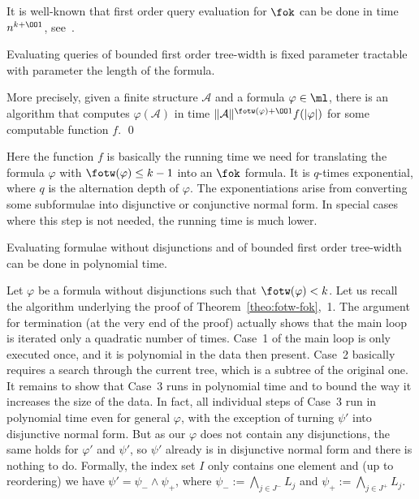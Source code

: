 \documentclass{LMCS}
\renewcommand{\phi}{\varphi}
\begin{document}
It is well-known that first order query evaluation for $\fok$ 
can be done in time $n^{k+\OO1}$, see~\cite{vardi95}. 

\begin{cor}\label{cor:fo-eval}
	Evaluating queries of bounded first order tree-width is fixed
	parameter tractable with parameter the length of the formula. 
	
	More precisely, given a finite structure $\mathcal A$ 
and a formula $\phi\in\ml$, 
there is an algorithm that computes $\phi(\mathcal A)$ in time 
$\|\mathcal A\|^{\fotw(\phi)+\OO1}f(\left|\varphi\right|)$
for some computable function $f$.
\qed\end{cor}

Here the function $f$ is basically the running time we need for translating 
the formula $\phi$ with $\fotw(\phi)\leq k-1$
into an $\fok$ formula. It is $q$-times exponential, 
where $q$ is the alternation depth of $\phi$. 
The exponentiations arise from converting some subformulae 
into disjunctive or conjunctive normal form. 
In special cases where this step is not needed, the running time is much lower. 

\begin{cor}\label{cor:mc in ptime}
Evaluating formulae without disjunctions and of bounded first order tree-width 
can be done in polynomial time. 
\end{cor}

\proof
Let $\phi$ be a formula without disjunctions such that $\fotw(\phi)<k$. 
Let us recall the algorithm 
underlying the proof of Theorem~\ref{theo:fotw-fok},~1. 
The argument for termination (at the very end of the proof) 
actually shows that the main loop is iterated only a quadratic number of times. 
Case~1 of the main loop is only executed once, 
and it is polynomial in the data then present. 
Case~2 basically requires a search through the current tree, 
which is a subtree of the original one. 
It remains to show that Case~3 runs in polynomial time 
and to bound the way it increases the size of the data. 
In fact, all individual steps of Case~3 
run in polynomial time even for general $\phi$, 
with the exception of turning $\psi'$ into disjunctive normal form. 
But as our $\phi$ does not contain any disjunctions, 
the same holds for $\phi'$ and $\psi'$, 
so $\psi'$ already is in disjunctive normal form and there is nothing to do. 
Formally, the index set $I$ only contains one element 
and (up to reordering) we have $\psi'=\psi_-\wedge\psi_+$, 
where $\psi_-:=\bigwedge\limits_{j\in J^-}L_j$ 
and $\psi_+:=\bigwedge\limits_{j\in J^+}L_j$. 
\end{document}
